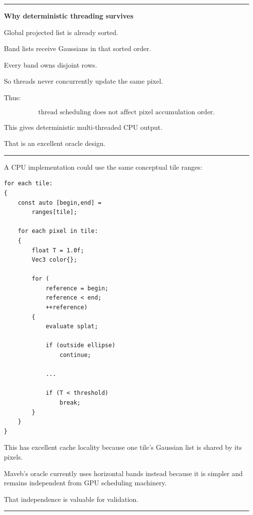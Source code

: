 \begin{center}\rule{0.5\linewidth}{0.5pt}\end{center}

\textbf{Why deterministic threading survives}

Global projected list is already sorted.

Band lists receive Gaussians in that sorted order.

Every band owns disjoint rows.

So threads never concurrently update the same pixel.

Thus:

\[
\boxed{
\text{thread scheduling does not affect pixel accumulation order}.
}
\]

This gives deterministic multi-threaded CPU output.

That is an excellent oracle design.

\begin{center}\rule{0.5\linewidth}{0.5pt}\end{center}

A CPU implementation could use the same conceptual tile ranges:

\protect{}\label{tfx8be}%
\begin{verbatim}
for each tile:
{
    const auto [begin,end] =
        ranges[tile];

    for each pixel in tile:
    {
        float T = 1.0f;
        Vec3 color{};

        for (
            reference = begin;
            reference < end;
            ++reference)
        {
            evaluate splat;

            if (outside ellipse)
                continue;

            ...

            if (T < threshold)
                break;
        }
    }
}
\end{verbatim}

This has excellent cache locality because one tile's Gaussian list is shared by its pixels.

Maveb's oracle currently uses horizontal bands instead because it is simpler and remains independent from GPU scheduling machinery.

That independence is valuable for validation.

\begin{center}\rule{0.5\linewidth}{0.5pt}\end{center}

